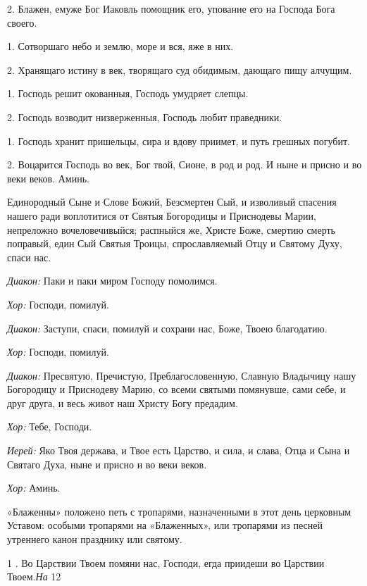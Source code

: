  2. Блажен, емуже Бог Иаковль помощник его, упование его на Господа Бога своего. 

 1. Сотворшаго небо и землю, море и вся, яже в них. 

 2. Хранящаго истину в век, творящаго суд обидимым, дающаго пищу алчущим. 

 1. Господь решит окованныя, Господь умудряет слепцы. 

 2. Господь возводит низверженныя, Господь любит праведники. 

 1. Господь хранит пришельцы, сира и вдову приимет, и путь грешных погубит. 

 2. Воцарится Господь во век, Бог твой, Сионе, в род и род. И ныне и присно и во веки веков. Аминь.  


 Единородный Сыне и Слове Божий, Безсмертен Сый, и изволивый спасения нашего ради воплотитися от Святыя Богородицы и Приснодевы Марии, непреложно вочеловечивыйся; распныйся же, Христе Боже, смертию смерть поправый, един Сый Святыя Троицы, спрославляемый Отцу и Святому Духу, спаси нас.  


 {\itshape Диакон:} Паки и паки миром Господу помолимся. 

 {\itshape Хор:} Господи, помилуй. 

 {\itshape Диакон:} Заступи, спаси, помилуй и сохрани нас, Боже, Твоею благодатию. 

 {\itshape Хор:} Господи, помилуй. 

 {\itshape Диакон:} Пресвятую, Пречистую, Преблагословенную, Славную Владычицу нашу Богородицу и Приснодеву Марию, со всеми святыми помянувше, сами себе, и друг друга, и весь живот наш Христу Богу предадим.

 {\itshape Хор:} Тебе, Господи. 

 {\itshape Иерей:} Яко Твоя держава, и Твое есть Царство, и сила, и слава, Отца и Сына и Святаго Духа, ныне и присно и во веки веков. 

 {\itshape Хор:} Аминь. 


 «Блаженны» положено петь с тропарями, назначенными в этот день церковным Уставом: особыми тропарями на «Блаженных», или тропарями из песней утреннего канон празднику или святому.

 1 . Во Царствии Твоем помяни нас, Господи, егда приидеши во Царствии Твоем.{\itshape  На }12 

